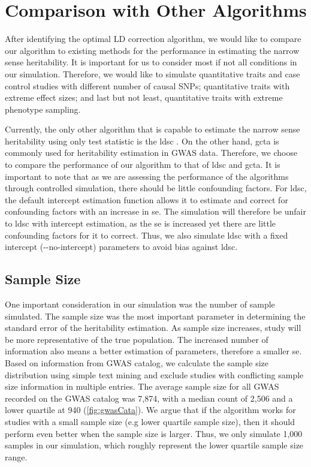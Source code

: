 		\section{Comparison with Other Algorithms}
		After identifying the optimal \gls{LD} correction algorithm, we would like to compare our algorithm to existing methods for the performance in estimating the narrow sense heritability.
		It is important for us to consider most if not all conditions in our simulation. 
		Therefore, we would like to simulate quantitative traits and case control studies with different number of causal \glspl{SNP}; quantitative traits with extreme effect sizes; and last but not least, quantitative traits with extreme phenotype sampling.
		
		Currently, the only other algorithm that is capable to estimate the narrow sense heritability using only test statistic is the \gls{ldsc} \citep{Bulik-Sullivan2015}. 
		On the other hand, \gls{gcta} \citep{Yang2011} is commonly used for heritability estimation in \gls{GWAS} data. 
		Therefore, we choose to compare the performance of our algorithm to that of \gls{ldsc} and \gls{gcta}.
		It is important to note that as we are assessing the performance of the algorithms through controlled simulation, there should be little confounding factors. 
		For \gls{ldsc}, the default intercept estimation function allows it to estimate and correct for confounding factors with an increase in \gls{se}. 
		The simulation will therefore be unfair to \gls{ldsc} with intercept estimation, as the \gls{se} is increased yet there are little confounding factors for it to correct.
		Thus, we also simulate \gls{ldsc} with a fixed intercept (-{}-no-intercept) parameters to avoid bias against \gls{ldsc}.	
		
		\subsection{Sample Size}
			One important consideration in our simulation was the number of sample simulated. 
			The sample size was the most important parameter in determining the standard error of the heritability estimation. 
			As sample size increases, study will be more representative of the true population. 
			The increased number of information also means a better estimation of parameters, therefore a smaller \acrfull{se}.
			Based on information from \gls{GWAS} catalog\citep{Welter2014}, we calculate the sample size distribution using simple text mining and exclude studies with conflicting sample size information in multiple entries. 
			The average sample size for all \gls{GWAS} recorded on the \gls{GWAS} catalog was 7,874, with a median count of 2,506 and a lower quartile at 940 (\cref{fig:gwasCata}). 
			We argue that if the algorithm works for studies with a small sample size (e.g lower quartile sample size), then it should perform even better when the sample size is larger. 
			Thus, we only simulate 1,000 samples in our simulation, which roughly represent the lower quartile sample size range.
				
